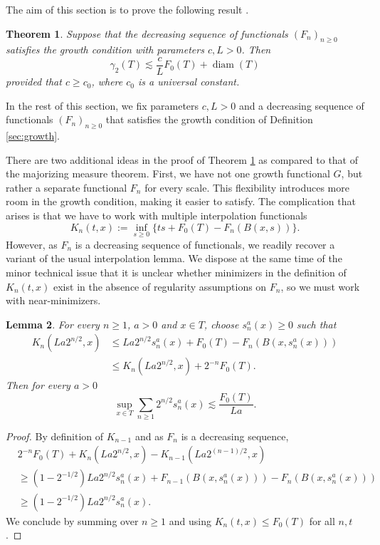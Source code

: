 \documentclass[10pt,reqno]{amsart}
\newtheorem{thm}{Theorem}[section]
\newtheorem{lem}[thm]{Lemma}
\theoremstyle{definition}
\numberwithin{equation}{section}
\numberwithin{figure}{section}
\numberwithin{table}{section}
\newcommand{\diam}{\mathop{\mathrm{diam}}}
\begin{document}
The aim of this section is to prove the following result
\cite[Theorem 2.3.16]{Tal14}.

\begin{thm}
\label{thm:growth}
Suppose that the decreasing sequence of functionals $(F_n)_{n\ge 0}$ 
satisfies the growth condition with parameters $c,L>0$. Then
$$
	\gamma_2(T) \lesssim \frac{c}{L}F_0(T) + \diam(T)
$$
provided that $c\ge c_0$, where $c_0$ is a universal constant.
\end{thm}

In the rest of this section, we fix parameters $c,L>0$ and
a decreasing sequence of functionals $(F_n)_{n\ge 0}$ that
satisfies the growth condition of Definition \ref{sec:growth}.

There are two additional ideas in the proof of Theorem \ref{thm:growth} as 
compared to that of the majorizing measure theorem. First, we have not one 
growth functional $G$, but rather a separate functional $F_n$ for every 
scale. This flexibility introduces more room in the growth condition, 
making it easier to satisfy. The complication that arises is that we have 
to work with multiple interpolation functionals
$$
	K_n(t,x) := \inf_{s\ge 0}\{
	ts+F_0(T)-F_n(B(x,s))
	\}.
$$
However, as $F_n$ is a decreasing sequence of functionals, we readily 
recover a variant of the usual interpolation lemma. We dispose at the same 
time of the minor technical issue that it is unclear whether minimizers in 
the definition of $K_n(t,x)$ exist in the absence of regularity 
assumptions on $F_n$, so we must work with near-minimizers.

\begin{lem}
\label{lem:multinterp}
For every $n\ge 1$, $a>0$ and $x\in T$, choose $s_n^a(x)\ge 0$ such that
\begin{align*}
	K_n(La2^{n/2},x) &\le 
	La2^{n/2}s_n^a(x)+F_0(T)-F_n(B(x,s_n^a(x))) \\ &\le
	K_n(La2^{n/2},x) + 2^{-n}F_0(T).
\end{align*}
Then for every $a>0$
$$
	\sup_{x\in T}
	\sum_{n\ge 1}2^{n/2}s_n^a(x) \lesssim \frac{F_0(T)}{La}.
$$
\end{lem}

\begin{proof}
By definition of $K_{n-1}$ and as $F_n$ is a decreasing sequence,
\begin{align*}
	&2^{-n}F_0(T) +
	K_n(La2^{n/2},x) -
	K_{n-1}(La2^{(n-1)/2},x)
	 \\ &\ge
	(1-2^{-1/2})La2^{n/2}s_n^a(x)
	+F_{n-1}(B(x,s_n^a(x)))
	-F_n(B(x,s_n^a(x)))
	 \\ &\ge
	(1-2^{-1/2})La2^{n/2}s_n^a(x).
\end{align*}
We conclude by summing over $n\ge 1$ and using
$K_n(t,x)\le F_0(T)$ for all $n,t$.
\end{proof}
\end{document}
